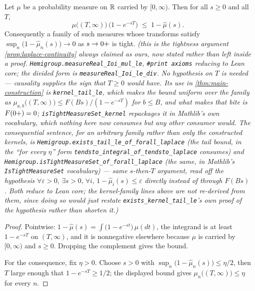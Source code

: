 \begin{lemma}\label{lem:transform-tightness}
\leanok
Let $\mu$ be a probability measure on $\mathbb{R}$ carried by $[0,\infty)$. Then for all $s \ge 0$ and
all $T$,
\[
  \mu\bigl((T,\infty)\bigr)\,\bigl(1 - e^{-sT}\bigr) \;\le\; 1 - \hat\mu(s).
\]
Consequently a family of such measures whose transforms satisfy
$\sup_n \bigl(1 - \hat\mu_n(s)\bigr) \to 0$ as $s \to 0{+}$ is tight.
\statusT\quad\emph{(this is the tightness argument \ref{prop:laplace-continuity} always claimed
as ours, now stated rather than left inside a proof. \texttt{Hemigroup.measureReal\_Ioi\_mul\_le},
\texttt{\#print axioms} reducing to Lean core; the divided form is
\texttt{measureReal\_Ioi\_le\_div}. No hypothesis on $T$ is needed --- causality supplies the
sign that $T \ge 0$ would have. Its use in \ref{thm:main-construction} is
\texttt{kernel\_tail\_le}, which makes the bound uniform over the family as
$\mu_{a,b}\bigl((T,\infty)\bigr) \le F(Bs)/(1 - e^{-sT})$ for $b \le B$, and what makes that
bite is $F(0{+}) = 0$; \texttt{isTightMeasureSet\_kernel} repackages it in Mathlib's own
vocabulary, which nothing here now consumes but any other consumer would.
\emph{The consequential sentence, for an arbitrary family rather than only the constructed
kernels}, is \texttt{Hemigroup.exists\_tail\_le\_of\_forall\_laplace} (the tail bound, in the
``for every $\eta$'' form \texttt{tendsto\_integral\_of\_tendsto\_laplace} consumes) and
\texttt{Hemigroup.isTightMeasureSet\_of\_forall\_laplace} (the same, in Mathlib's
\texttt{IsTightMeasureSet} vocabulary) --- same $s$-then-$T$ argument, read off the hypothesis
\texttt{$\forall \varepsilon > 0,\, \exists s > 0,\, \forall i,\, 1 - \hat\mu_i(s) \le
\varepsilon$} directly instead of through $F(Bs)$. Both reduce to Lean core; the kernel-family
lines above are not re-derived from them, since doing so would just restate
\texttt{exists\_kernel\_tail\_le}'s own proof of the hypothesis rather than shorten it.)}
\end{lemma}

\begin{proof}
\leanok
Pointwise: $1 - \hat\mu(s) = \int \bigl(1 - e^{-st}\bigr)\,\mu(dt)$, the integrand is at least
$1 - e^{-sT}$ on $(T,\infty)$, and it is nonnegative elsewhere because $\mu$ is carried by
$[0,\infty)$ and $s \ge 0$. Dropping the complement gives the bound.

For the consequence, fix $\eta > 0$. Choose $s > 0$ with
$\sup_n \bigl(1 - \hat\mu_n(s)\bigr) \le \eta/2$, then $T$ large enough that
$1 - e^{-sT} \ge 1/2$; the displayed bound gives $\mu_n\bigl((T,\infty)\bigr) \le \eta$ for
every $n$.
\end{proof}
